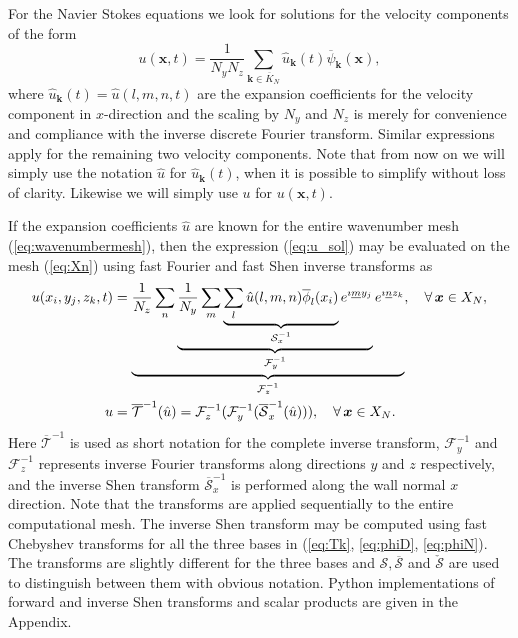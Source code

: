 \documentclass[11pt, oneside]{article}
\newcommand{\N}[1]{\check{#1}}
\newcommand{\D}[1]{\overline{#1}}
\begin{document}
For the Navier Stokes equations we look for solutions for the velocity components of the form
\begin{equation}
u(\bm{x}, t) = \frac{1}{N_yN_z}\sum_{\bm{k} \in \D{K}_N} \hat{u}_{\bm{k}}(t) \D{\psi}_{\bm{k}}(\bm{x}), \label{eq:u_sol}
\end{equation}
where $\hat{u}_{\bm{k}}(t) = \hat{u}(l, {m}, {n}, t)$ are the expansion coefficients for the velocity component in $x$-direction and the scaling by $N_y$ and $N_z$ is merely for convenience and compliance with the inverse discrete Fourier transform. Similar expressions apply for the remaining two velocity components. Note that from now on we will simply use the notation $\hat{u}$ for $\hat{u}_{\bm{k}}(t)$, when it is possible to simplify without loss of clarity. Likewise we will simply use $u$ for $u(\bm{x}, t)$. 

If the expansion coefficients $\hat{u}$  are known for the entire wavenumber mesh (\ref{eq:wavenumbermesh}), then the expression (\ref{eq:u_sol}) may be evaluated on the mesh (\ref{eq:Xn}) using fast Fourier and fast Shen inverse transforms as
\begin{align}
u(x_i, y_j, z_k, t) &= \underbrace{\frac{1}{N_z}\sum_n \underbrace{\frac{1}{N_y} \sum_m \underbrace{\sum_l \hat{u}(l,m,n)\D{\phi}_l(x_i)}_{\mathcal{S}_x^{-1}} e^{\imath \underline{m} y_j}}_{\mathcal{F}_y^{-1}} e^{\imath \underline{n} z_k}}_{\mathcal{F}_z^{-1}} , \quad \forall \, \bm{x} \in X_N, \notag \\
  u &= \D{\mathcal{T}}^{-1}(\hat{u}) =  \mathcal{F}^{-1}_z (\mathcal{F}^{-1}_y (\D{\mathcal{S}}^{-1}_x (\hat{u}))), \quad \forall \, \bm{x} \in X_N.  \label{eq:ifft} 
\end{align}
Here $\D{\mathcal{T}}^{-1}$ is used as short notation for the complete inverse transform, $\mathcal{F}_{y}^{-1}$ and $\mathcal{F}_{z}^{-1}$ represents inverse Fourier transforms along directions $y$ and $z$ respectively, and the inverse Shen transform $\D{\mathcal{S}}_{x}^{-1}$ is performed along the wall normal $x$ direction. Note that the transforms are applied sequentially to the entire computational mesh. The inverse Shen transform may be computed using fast Chebyshev transforms for all the three bases in (\ref{eq:Tk}, \ref{eq:phiD}, \ref{eq:phiN}). The transforms are slightly different for the three bases and ${\mathcal{S}}, \D{\mathcal{S}}$ and $\N{\mathcal{S}}$ are used to distinguish between them with obvious notation. Python implementations of forward and inverse Shen transforms and scalar products are given in the Appendix.
\end{document}

